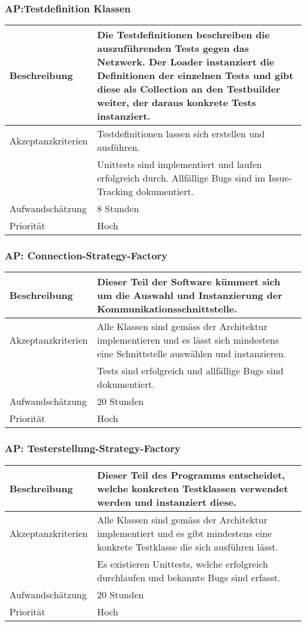 \documentclass[
	ngerman,
	toc=listof, %
	toc=bibliography, %
	footnotes=multiple, %
	parskip=half, %
	numbers=noendperiod %
]{scrartcl}
\begin{document}
	\subsubsection{AP:Testdefinition Klassen}
	\begin{tabularx}{\textwidth}{lX}
		\toprule
		Beschreibung & Die Testdefinitionen beschreiben die auszuführenden Tests gegen das Netzwerk. Der Loader instanziert die Definitionen der einzelnen Tests und gibt diese als Collection an den Testbuilder weiter, der daraus konkrete Tests instanziert.\\
		\midrule
		Akzeptanzkriterien & Testdefinitionen lassen sich erstellen und ausführen.\\
		 & Unittests sind implementiert und laufen erfolgreich durch. Allfällige Bugs sind im Issue-Tracking dokumentiert.\\
		\midrule
		Aufwandschätzung & 8 Stunden\\
		\midrule
		Priorität & Hoch\\
		\bottomrule
	\end{tabularx}

	\subsubsection{AP: Connection-Strategy-Factory}
	\begin{tabularx}{\textwidth}{lX}
		\toprule
		Beschreibung & Dieser Teil der Software kümmert sich um die Auswahl und Instanzierung der Kommunikationsschnittstelle.\\
		\midrule
		Akzeptanzkriterien & Alle Klassen sind gemäss der Architektur implementieren und es lässt sich mindestens eine Schnittstelle auswählen und instanzieren.\\
		 & Tests sind erfolgreich und allfällige Bugs sind dokumentiert.\\
		\midrule
		Aufwandschätzung & 20 Stunden\\
		\midrule
		Priorität & Hoch\\
		\bottomrule
	\end{tabularx}

	\subsubsection{AP: Testerstellung-Strategy-Factory}
	\begin{tabularx}{\textwidth}{lX}
		\toprule
		Beschreibung & Dieser Teil des Programms entscheidet, welche konkreten Testklassen verwendet werden und instanziert diese.\\
		\midrule
		Akzeptanzkriterien & Alle Klassen sind gemäss der Architektur implementiert und es gibt mindestens eine konkrete Testklasse die sich ausführen lässt. \\
		 & Es existieren Unittests, welche erfolgreich durchlaufen und bekannte Bugs sind erfasst.\\
		\midrule
		Aufwandschätzung & 20 Stunden\\
		\midrule
		Priorität & Hoch\\
		\bottomrule
	\end{tabularx}
	\newpage
\end{document}
